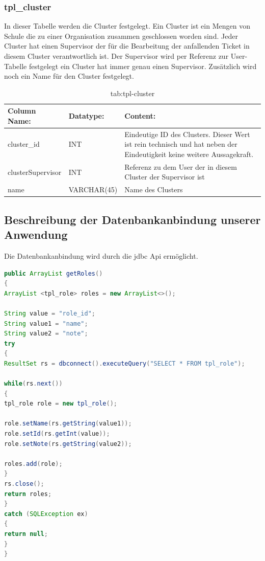 \newpage

\subsubsection{tpl\_cluster}

In dieser Tabelle werden die Cluster festgelegt. Ein Cluster ist ein Mengen von Schule die zu einer Organisation zusammen geschlossen worden sind. Jeder Cluster hat einen Supervisor der für die Bearbeitung der anfallenden Ticket in diesem Cluster verantwortlich ist.
Der Supervisor wird per Referenz zur User-Tabelle festgelegt ein Cluster hat immer genau einen Supervisor. Zusätzlich wird noch ein Name für den Cluster festgelegt.

\begin{table}[h]
	\begin{tabular}{|p{3.5cm}|p{4cm}|p{6.2cm}|}
		\hline
		\textbf{Column Name:} & \textbf{Datatype:} & \textbf{Content:}\\
		\hline
		cluster\_id & INT & Eindeutige ID des Clusters. Dieser Wert ist rein technisch und hat neben der Eindeutigkeit keine weitere Aussagekraft.\\
		\hline
		clusterSupervisor & INT & Referenz zu dem User der in diesem Cluster der Supervisor ist\\
		\hline
		name & VARCHAR(45) & Name des Clusters\\
		\hline
	\end{tabular}
	\caption{tab:tpl-cluster}
\end{table}
\label{tab:tpl_cluster}

\newpage

\subsection{Beschreibung der Datenbankanbindung unserer Anwendung}

Die Datenbankanbindung wird durch die jdbc Api ermöglicht.

\begin{lstlisting}[language=JAVA, caption=Datenbankanbindung.java/getRoles-Methode, firstnumber=59]
public ArrayList getRoles()
{
ArrayList <tpl_role> roles = new ArrayList<>();

String value = "role_id";
String value1 = "name";
String value2 = "note";
try 
{
ResultSet rs = dbconnect().executeQuery("SELECT * FROM tpl_role");

while(rs.next())
{
tpl_role role = new tpl_role();

role.setName(rs.getString(value1));
role.setId(rs.getInt(value));
role.setNote(rs.getString(value2));

roles.add(role);
}
rs.close();
return roles;
} 
catch (SQLException ex) 
{
return null;
}
}

\end{lstlisting}

